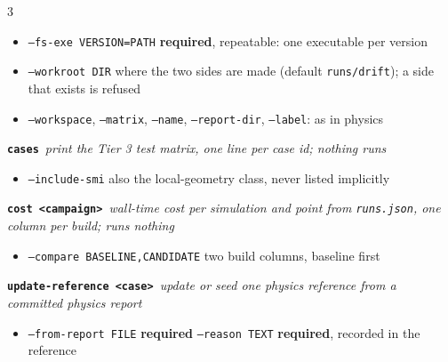 \documentclass[a4paper,landscape]{article}
\newcommand{\fl}[1]{\textcolor{flag}{\texttt{#1}}}
\newcommand{\cmd}[1]{\textcolor{acc}{\textbf{\texttt{#1}}}}
\newenvironment{flags}{\begin{itemize}[leftmargin=2.2mm,itemsep=-0.4pt,topsep=0pt,parsep=0pt,label={\tiny$\bullet$}]}{\end{itemize}}
\newcommand{\sub}[2]{\vspace{1.4pt}\cmd{#1}\ {\itshape #2}\par}
\begin{document}
\begin{multicols}{3}
\begin{flags}
\item \fl{--fs-exe VERSION=PATH} \textbf{required}, repeatable: one executable per version
\item \fl{--workroot DIR} where the two sides are made (default \texttt{runs/drift}); a side that exists is refused
\item \fl{--workspace}, \fl{--matrix}, \fl{--name}, \fl{--report-dir}, \fl{--label}: as in physics
\end{flags}
\sub{cases}{print the Tier 3 test matrix, one line per case id; nothing runs}
\begin{flags}
\item \fl{--include-smi} also the local-geometry class, never listed implicitly
\end{flags}
\sub{cost <campaign>}{wall-time cost per simulation and point from \texttt{runs.json}, one column per build; runs nothing}
\begin{flags}
\item \fl{--compare BASELINE,CANDIDATE} two build columns, baseline first
\end{flags}
\sub{update-reference <case>}{update or seed one physics reference from a committed physics report}
\begin{flags}
\item \fl{--from-report FILE} \textbf{required} \quad \fl{--reason TEXT} \textbf{required}, recorded in the reference
\end{flags}


\end{multicols}
\end{document}
